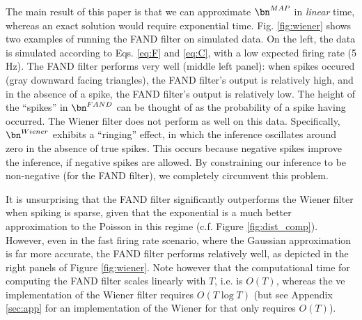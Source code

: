 The main result of this paper is that we can approximate $\bn^{MAP}$ in \emph{linear} time, whereas an exact solution would require exponential time. Fig. \ref{fig:wiener} shows two examples of running the FAND filter on simulated data.  On the left, the data is simulated according to Eqs. \eqref{eq:F} and \eqref{eq:C}, with a low expected firing rate (5 Hz).  The FAND filter performs very well (middle left panel): when spikes occured (gray downward facing triangles), the FAND filter's output is relatively high, and in the absence of a spike, the FAND filter's output is relatively low. The height of the ``spikes'' in $\bn^{FAND}$ can be thought of as the probability of a spike having occurred.  The Wiener filter does not perform as well on this data.  Specifically, $\bn^{Wiener}$ exhibits a ``ringing'' effect, in which the inference oscillates around zero in the absence of true spikes.  This occurs because negative spikes improve the inference, if negative spikes are allowed.  By constraining our inference to be non-negative (for the FAND filter), we completely circumvent this problem.  

It is unsurprising that the FAND filter significantly outperforms the Wiener filter when spiking is sparse, given that the exponential is a much better approximation to the Poisson in this regime (c.f. Figure \ref{fig:dist_comp}).  However, even in the fast firing rate scenario, where the Gaussian approximation is far more accurate, the FAND filter performs relatively well, as depicted in the right panels of Figure \ref{fig:wiener}.  Note however that the computational time for computing the FAND filter scales linearly with $T$, i.e. is $O(T)$, whereas the \nai ve implementation of the Wiener filter requires $O(T \log T)$ (but see Appendix \ref{sec:app} for an implementation of the Wiener for that only requires $O(T)$).  

